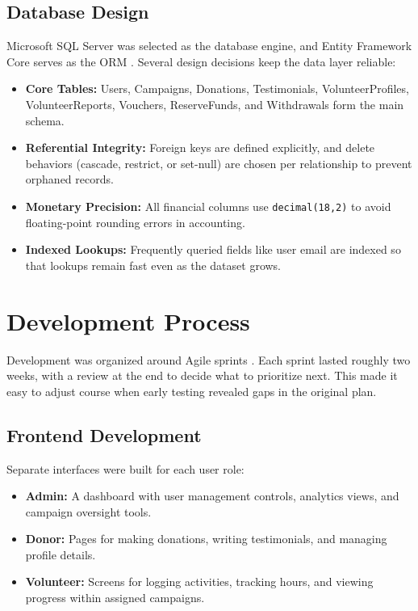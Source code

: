 \documentclass{thesis-library}
\begin{document}
\subsection{Database Design}
Microsoft SQL Server was selected as the database engine, and Entity Framework Core serves as the ORM \cite{lerman2020efcore,coronel2016database}. Several design decisions keep the data layer reliable:
\begin{itemize}
    \item \textbf{Core Tables:} Users, Campaigns, Donations, Testimonials, VolunteerProfiles, VolunteerReports, Vouchers, ReserveFunds, and Withdrawals form the main schema.
    \item \textbf{Referential Integrity:} Foreign keys are defined explicitly, and delete behaviors (cascade, restrict, or set-null) are chosen per relationship to prevent orphaned records.
    \item \textbf{Monetary Precision:} All financial columns use \texttt{decimal(18,2)} to avoid floating-point rounding errors in accounting.
    \item \textbf{Indexed Lookups:} Frequently queried fields like user email are indexed so that lookups remain fast even as the dataset grows.
\end{itemize}

\section{Development Process}

Development was organized around Agile sprints \cite{beck2001agile,highsmith2001agile}. Each sprint lasted roughly two weeks, with a review at the end to decide what to prioritize next. This made it easy to adjust course when early testing revealed gaps in the original plan.

\subsection{Frontend Development}
Separate interfaces were built for each user role:
\begin{itemize}
    \item \textbf{Admin:} A dashboard with user management controls, analytics views, and campaign oversight tools.
    \item \textbf{Donor:} Pages for making donations, writing testimonials, and managing profile details.
    \item \textbf{Volunteer:} Screens for logging activities, tracking hours, and viewing progress within assigned campaigns.
\end{itemize}
\end{document}
